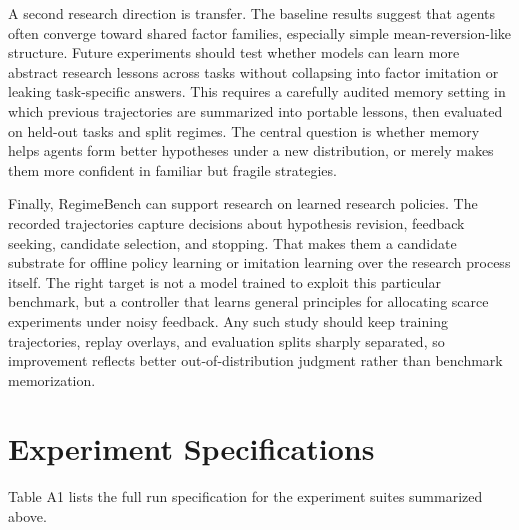 \documentclass[
]{article}
\newcommand{\regimeclearpage}{\FloatBarrier\clearpage}
\begin{document}
A second research direction is transfer. The baseline results suggest that agents often converge toward shared factor families, especially simple mean-reversion-like structure. Future experiments should test whether models can learn more abstract research lessons across tasks without collapsing into factor imitation or leaking task-specific answers. This requires a carefully audited memory setting in which previous trajectories are summarized into portable lessons, then evaluated on held-out tasks and split regimes. The central question is whether memory helps agents form better hypotheses under a new distribution, or merely makes them more confident in familiar but fragile strategies.

Finally, RegimeBench can support research on learned research policies. The recorded trajectories capture decisions about hypothesis revision, feedback seeking, candidate selection, and stopping. That makes them a candidate substrate for offline policy learning or imitation learning over the research process itself. The right target is not a model trained to exploit this particular benchmark, but a controller that learns general principles for allocating scarce experiments under noisy feedback. Any such study should keep training trajectories, replay overlays, and evaluation splits sharply separated, so improvement reflects better out-of-distribution judgment rather than benchmark memorization.

\appendix
\regimeclearpage
\section{Experiment Specifications}

Table A1 lists the full run specification for the experiment suites summarized above.
\end{document}
